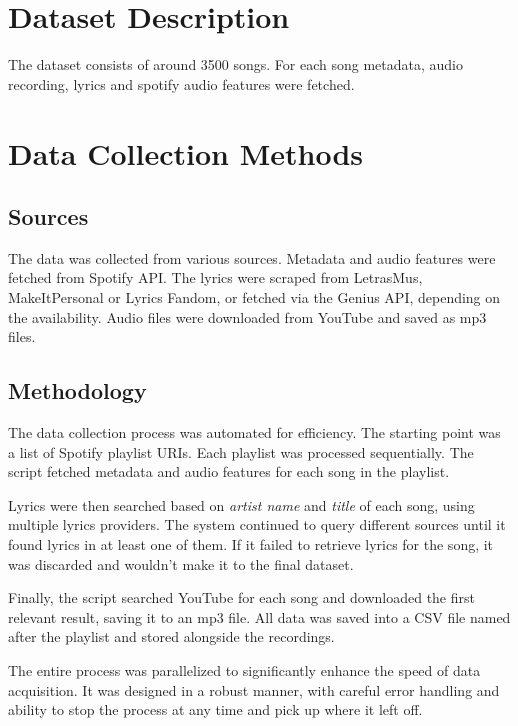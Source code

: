 
\section{Dataset Description}
\label{sec:datasetdescription}

The dataset consists of around 3500 songs. For each song metadata, audio
recording, lyrics and spotify audio features were fetched.

\section{Data Collection Methods}
\label{sec:datacollectionmethods}

\subsection{Sources}
The data was collected from various sources. Metadata and audio features were
fetched from Spotify API. The lyrics were scraped from LetrasMus,
MakeItPersonal or Lyrics Fandom, or fetched via the Genius API, depending on
the availability. Audio files were downloaded from YouTube and saved as mp3
files.

\subsection{Methodology}
The data collection process was automated for efficiency. The starting point
was a list of Spotify playlist URIs. Each playlist was processed sequentially. 
The script fetched metadata and audio features for each song in the
playlist.

Lyrics were then searched based on \textit{artist name} and \textit{title} of
each song, using multiple lyrics providers. The system continued to query
different sources until it found lyrics in at least one of them. If it failed
to retrieve lyrics for the song, it was discarded and wouldn't make it to the
final dataset.

Finally, the script  searched YouTube for each song and downloaded the first
relevant result, saving it to an mp3 file. All data was saved into a CSV
file named after the playlist and stored alongside the recordings.

The entire process was parallelized to significantly enhance the speed of data
acquisition. It was designed in a robust manner, with careful error handling
and ability to stop the process at any  time and pick up where it left off.

